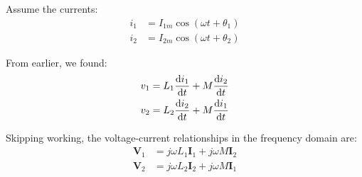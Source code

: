 \begin{multicols}{2}
{        Assume the currents:
        \begin{align*}
            i_1 &= I_{1m} \cos{(\omega t + \theta_1)}
                \\
            i_2 &= I_{2m} \cos{(\omega t + \theta_2)}
        \end{align*}

        From earlier, we found:
        \begin{align*}
            v_1 &= L_1 \frac{\mathrm{d}i_1}{\mathrm{d}t} + M \frac{\mathrm{d}i_2}{\mathrm{d}t} \\
            v_2 &= L_2 \frac{\mathrm{d}i_2}{\mathrm{d}t} + M \frac{\mathrm{d}i_1}{\mathrm{d}t}
        \end{align*}

        Skipping working, the voltage-current relationships in the frequency domain are:
        \begin{align*}
            \mathbf{V}_1 &= j \omega L_1 \mathbf{I}_1 + j \omega M \mathbf{I}_2 \\
            \mathbf{V}_2 &= j \omega L_2 \mathbf{I}_2 + j \omega M \mathbf{I}_1
        \end{align*}

    }

\end{multicols}
\newpage
